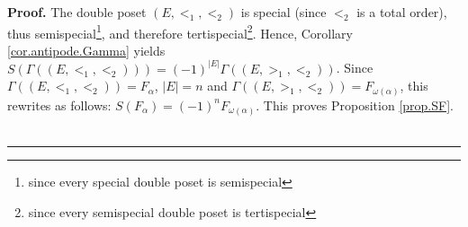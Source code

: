 \documentclass[numbers=enddot,12pt,final,onecolumn,notitlepage,abstracton]{scrartcl}
\theoremstyle{definition}
\newenvironment{proof}[1][Proof]{\noindent\textbf{#1.} }{\ \rule{0.5em}{0.5em}}
\newenvironment{verlong}{}{}
\begin{document}
\begin{verlong}
\begin{footnotesize}
\begin{proof}
The double poset $\left(  E,<_{1},<_{2}\right)  $ is special (since $<_{2}$ is
a total order), thus semispecial\footnote{since every special double poset is
semispecial}, and therefore tertispecial\footnote{since every semispecial
double poset is tertispecial}. Hence, Corollary \ref{cor.antipode.Gamma}
yields $S\left(  \Gamma\left(  \left(  E,<_{1},<_{2}\right)  \right)  \right)
=\left(  -1\right)  ^{\left\vert E\right\vert }\Gamma\left(  \left(
E,>_{1},<_{2}\right)  \right)  $. Since $\Gamma\left(  \left(  E,<_{1}%
,<_{2}\right)  \right)  =F_{\alpha}$, $\left\vert E\right\vert =n$ and
$\Gamma\left(  \left(  E,>_{1},<_{2}\right)  \right)  =F_{\omega\left(
\alpha\right)  }$, this rewrites as follows: $S\left(  F_{\alpha}\right)
=\left(  -1\right)  ^{n}F_{\omega\left(  \alpha\right)  }$. This proves
Proposition \ref{prop.SF}.
\end{proof}

\end{footnotesize}
\end{verlong}
\end{document}
